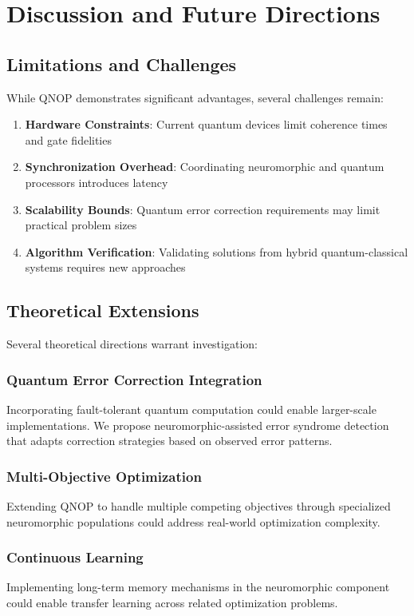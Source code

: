 \documentclass[arxiv,final,oneside,onecolumn]{arxiv-preprint-simple}
\begin{document}
\section{Discussion and Future Directions}

\subsection{Limitations and Challenges}

While QNOP demonstrates significant advantages, several challenges remain:

\begin{enumerate}
\item \textbf{Hardware Constraints}: Current quantum devices limit coherence times and gate fidelities
\item \textbf{Synchronization Overhead}: Coordinating neuromorphic and quantum processors introduces latency
\item \textbf{Scalability Bounds}: Quantum error correction requirements may limit practical problem sizes
\item \textbf{Algorithm Verification}: Validating solutions from hybrid quantum-classical systems requires new approaches
\end{enumerate}

\subsection{Theoretical Extensions}

Several theoretical directions warrant investigation:

\subsubsection{Quantum Error Correction Integration}
Incorporating fault-tolerant quantum computation could enable larger-scale implementations. We propose neuromorphic-assisted error syndrome detection that adapts correction strategies based on observed error patterns.

\subsubsection{Multi-Objective Optimization}
Extending QNOP to handle multiple competing objectives through specialized neuromorphic populations could address real-world optimization complexity.

\subsubsection{Continuous Learning}
Implementing long-term memory mechanisms in the neuromorphic component could enable transfer learning across related optimization problems.
\end{document}
